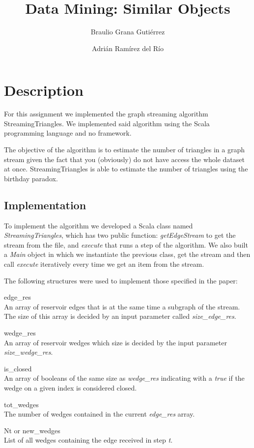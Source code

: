 \documentclass[12pt, a4paper]{article}
\title{Data Mining: Similar Objects}
\author{Braulio Grana Guti\'errez \and Adri\'an Ram\'irez del R\'io}
\begin{document}
\maketitle

\section{Description}
For this assignment we implemented the graph streaming algorithm StreamingTriangles. We implemented said algorithm using the Scala programming language and no framework.

The objective of the algorithm is to estimate the number of triangles in a graph stream given the fact that you (obviously) do not have access the whole dataset at once. StreamingTriangles is able to estimate the number of triangles using the birthday paradox.

\subsection{Implementation}
To implement the algorithm we developed a Scala class named \emph{StreamingTriangles}, which has two public function: \emph{getEdgeStream} to get the stream from the file, and \emph{execute} that runs a step of the algorithm. We also built a \emph{Main} object in which we instantiate the previous class, get the stream and then call \emph{execute} iteratively every time we get an item from the stream.

The following structures were used to implement those specified in the paper:

\begin{description}
\item{edge\_res} \\
An array of reservoir edges that is at the same time a subgraph of the stream. The size of this array is decided by an input parameter called \emph{size\_edge\_res}.

\item{wedge\_res} \\
An array of reservoir wedges which size is decided by the input parameter \emph{size\_wedge\_res}.

\item{is\_closed} \\
An array of booleans of the same size as \emph{wedge\_res} indicating with a \emph{true} if the wedge on a given index is considered closed.

\item{tot\_wedges} \\
The number of wedges contained in the current \emph{edge\_res} array.

\item{Nt or new\_wedges} \\
List of all wedges containing the edge received in step \emph{t}.

\end{description}
\end{document}
